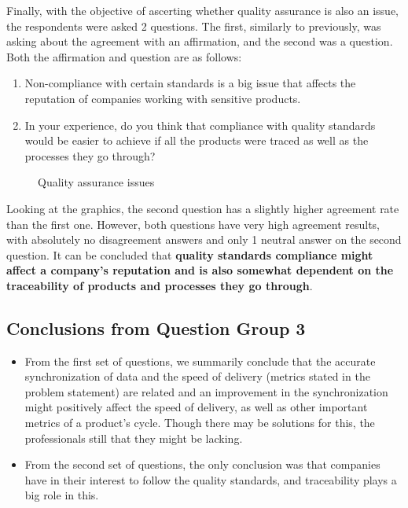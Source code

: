 Finally, with the objective of ascerting whether quality assurance is also an issue, the respondents were asked 2 questions. The first, similarly to previously, was asking about the agreement with an affirmation, and the second was a question. Both the affirmation and question are as follows:

\begin{enumerate}
  \item Non-compliance with certain standards is a big issue that affects the reputation of companies working with sensitive products.
  \item In your experience, do you think that compliance with quality standards would be easier to achieve if all the products were traced as well as the processes they go through?
\end{enumerate}

\begin{figure}[h]

    \caption{Quality assurance issues}
  \label{fig:group3_graphics2}
\end{figure}

Looking at the graphics, the second question has a slightly higher agreement rate than the first one. However, both questions have very high agreement results, with absolutely no disagreement answers and only 1 neutral answer on the second question. It can be concluded that \textbf{quality standards compliance might affect a company's reputation and is also somewhat dependent on the traceability of products and processes they go through}.


\subsection*{Conclusions from Question Group 3}


\begin{itemize}
  \item From the first set of questions, we summarily conclude that the accurate synchronization of data and the speed of delivery (metrics stated in the problem statement) are related and an improvement in the synchronization might positively affect the speed of delivery, as well as other important metrics of a product's cycle. Though there may be solutions for this, the professionals still that they might be lacking.

  \item From the second set of questions, the only conclusion was that companies have in their interest to follow the quality standards, and traceability plays a big role in this.
\end{itemize}

